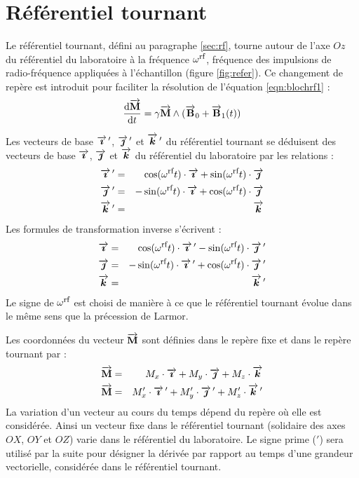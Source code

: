 \chapter{Référentiel tournant}
\label{chap:refer}

Le référentiel tournant, défini au paragraphe \ref{sec:rf}, tourne
autour de l'axe $Oz$ du référentiel du laboratoire à la fréquence $\omega^{\mbox{\footnotesize{rf}}}$,
fréquence des impulsions de radio-fréquence appliquées à l'échantillon
(figure \ref{fig:refer}).
Ce changement de repère est introduit pour faciliter la résolution de
l'équation \ref{eqn:blochrf1} :
\begin{equation}
\label{eqn:rf}
\frac{\mbox{d}\aimvec}{\mbox{d}t} =
\gamma \aimvec \wedge (\bzerovec + \bunvect)
\end{equation}

Les vecteurs de base $\overrightarrow{\boldsymbol{\imath}} \, '$, $\overrightarrow{\boldsymbol{\jmath}} \, '$ et $\overrightarrow{\boldsymbol{k}} \, '$ du référentiel tournant
se déduisent des vecteurs de base $\overrightarrow{\boldsymbol{\imath}}$, $\overrightarrow{\boldsymbol{\jmath}}$ et $\overrightarrow{\boldsymbol{k}}$
du référentiel du laboratoire par les relations :
\begin{eqnarray}
\iprimvec & = & \cos(\omrft) \cdot \ivec + \sin(\omrft) \cdot \jvec \nonumber\\
\label{eqn:fix2mob}
\jprimvec & = & - \sin(\omrft) \cdot \ivec + \cos(\omrft) \cdot \jvec \\
\kprimvec & = & \kvec \nonumber
\end{eqnarray}
Les formules de transformation inverse s'écrivent :
\begin{eqnarray}
\ivec & = & \cos(\omrft) \cdot \iprimvec - \sin(\omrft) \cdot \jprimvec \nonumber\\
\label{eqn:mob2fix}
\jvec & = & - \sin(\omrft) \cdot \iprimvec + \cos(\omrft) \cdot \jprimvec \\
\kvec & = & \kprimvec \nonumber
\end{eqnarray}
Le signe de $\omega^{\mbox{\footnotesize{rf}}}$ est choisi de manière à ce que le référentiel tournant
évolue dans le même sens que la précession de Larmor.

Les coordonnées du vecteur $\overrightarrow{\mathbf{M}}$ sont définies dans le repère fixe 
et dans le repère tournant par :
\begin{eqnarray}
\overrightarrow{\mathbf{M}} & = & M_x \cdot \overrightarrow{\boldsymbol{\imath}} + M_y \cdot \overrightarrow{\boldsymbol{\jmath}} + M_z \cdot \overrightarrow{\boldsymbol{k}} \\
\overrightarrow{\mathbf{M}} & = & M_x' \cdot \overrightarrow{\boldsymbol{\imath}} \, ' + M_y' \cdot \overrightarrow{\boldsymbol{\jmath}} \, ' + M_z' \cdot \overrightarrow{\boldsymbol{k}} \, '
\end{eqnarray}
La variation d'un vecteur au cours du temps dépend du repère où elle est considérée. 
Ainsi un vecteur fixe dans le référentiel tournant (solidaire des axes $OX$, $OY$ et $OZ$) 
varie dans le référentiel du laboratoire.
Le signe prime ($'$) sera utilisé par la suite pour désigner la dérivée
par rapport au temps d'une grandeur vectorielle, considérée dans le référentiel tournant.

